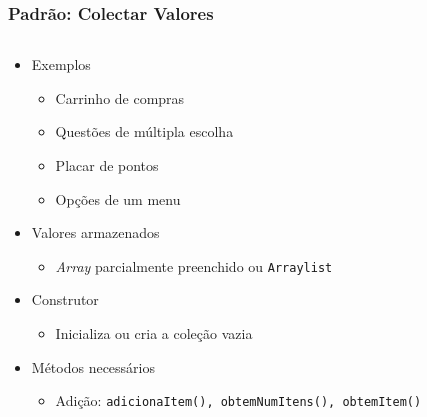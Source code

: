 \documentclass[xcolor={dvipsnames,table},aspectratio=169]{beamer}
\begin{document}
\begin{frame}[fragile]\frametitle{Padrão: Colectar Valores}
\begin{columns}[T]
	\begin{column}{0.5\linewidth}
\begin{itemize}
	\item Exemplos
	\begin{itemize}
		\item Carrinho de compras
		\item Questões de múltipla escolha
		\item Placar de pontos
		\item Opções de um menu
	\end{itemize}
	\item Valores armazenados
	\begin{itemize}
		\item \emph{Array} parcialmente preenchido ou \texttt{Arraylist}
	\end{itemize}
	\item Construtor
	\begin{itemize}
		\item Inicializa ou cria a coleção vazia
	\end{itemize}
	\item Métodos necessários
	\begin{itemize}
		\item Adição: \texttt{adicionaItem(), \texttt{obtemNumItens()}, \texttt{obtemItem()}}
	\end{itemize}
\end{itemize}
	\end{column}
	\begin{column}{0.5\linewidth}
{\tiny\inputminted[bgcolor=cyan!10]{java}{src/carrinho/CarrinhoDeCompras.java}}
	\end{column}
\end{columns}
\end{frame}
\end{document}
